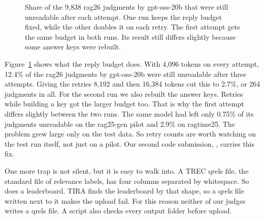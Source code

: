 \begin{figure}
  \caption{Share of the 9,838 rag26 judgments by gpt-oss-20b that were still
  unreadable after each attempt. One run keeps the reply budget fixed, while the
  other doubles it on each retry. The first attempt gets the same budget in both
  runs. Its result still differs slightly because some answer keys were rebuilt.}
  \label{fig:budget}
\end{figure}

Figure~\ref{fig:budget} shows what the reply budget does. With 4,096 tokens on
every attempt, 12.4\% of the rag26 judgments by gpt-oss-20b were still unreadable
after three attempts. Giving the retries 8,192 and then 16,384 tokens cut this to
2.7\%, or 264 judgments in all. For the second run we also rebuilt the answer keys.
Retries while building a key got the larger budget too. That is why the first
attempt differs slightly between the two runs. The same model had left only
0.75\% of its judgments unreadable on the rag25-gen pilot and 2.9\% on ragtime25.
The problem grew large only on the test data. So retry counts are worth watching
on the test run itself, not just on a pilot. Our second  code
submission, , carries this fix.

One more trap is not silent, but it is easy to walk into. A TREC qrels file, the
standard file of relevance labels, has four columns separated by whitespace. So does
a leaderboard. TIRA finds the leaderboard by that shape, so a qrels file written
next to it makes the upload fail. For this reason neither of our judges writes a
qrels file. A script also checks every output folder before upload.
